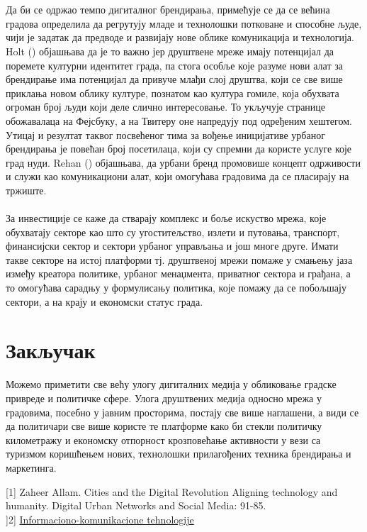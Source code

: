 \documentclass{article}
\begin{document}
\\\\
Да би се одржао темпо дигиталног брендирања, примећује се да се већина градова определила да регрутују младе и технолошки потковане и способне људе, чији је задатак да предводе и развијају нове облике комуникација и технологија. Holt (\cite{ho_2016}) објашњава да је то важно јер друштвене мреже имају потенцијал да поремете културни идентитет града, па стога особље које разуме нови алат за брендирање има потенцијал да привуче млађи слој друштва, који се све више приклања новом облику културе, познатом као култура гомиле, која обухвата огроман број људи који деле слично интересовање. То укључује странице обожавалаца на Фејсбуку, а на Твитеру оне напредују под одређеним хештегом. Утицај и резултат таквог посвећеног тима за вођење иницијативе урбаног брендирања је повећан број посетилаца, који су спремни да користе услуге које град нуди. Rehan (\cite{re_2014}) објашњава, да урбани бренд промовише концепт одрживости и служи као комуникациони алат, који омогућава градовима да се пласирају на тржиште. 
\\\\
За инвестиције се каже да стварају комплекс и боље искуство мрежа, које обухватају секторе као што су угоститељство, излети и путовања, транспорт, финансијски сектор и сектори урбаног управљања и још многе друге. Имати такве секторе на истој платформи тј. друштвеној мрежи помаже у смањењу јаза између креатора политике, урбаног менаџмента, приватног сектора и грађана, а то омогућава сарадњу у формулисању политика, које помажу да се побољшају сектори, а на крају и економски статус града.

\section{Закључак}
Можемо приметити све већу улогу дигиталних медија у
обликовање градске привреде и политичке сфере. Улога друштвених медија односно мрежа у градовима, посебно у јавним просторима, постају све више наглашени, а види се да политичари све више користе те платформе како би стекли политичку километражу и економску отпорност крозповећање активности у вези са туризмом коришћењем нових, технолошки прилагођених техника брендирања и маркетинга.

\newpage

 
[1] Zaheer Allam.    Cities and the  Digital  Revolution Aligning technology and humanity. Digital Urban Networks and Social Media: 91-85. \\ 
]2] \href{http://miticmirjana.weebly.com/104810501058-10901077109310851086108310861075108011121077.html}{Informaciono-komunikacione tehnologije}
\end{document}
